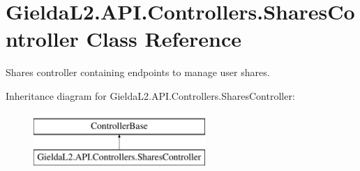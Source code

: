 \hypertarget{class_gielda_l2_1_1_a_p_i_1_1_controllers_1_1_shares_controller}{}\section{Gielda\+L2.\+A\+P\+I.\+Controllers.\+Shares\+Controller Class Reference}
\label{class_gielda_l2_1_1_a_p_i_1_1_controllers_1_1_shares_controller}


Shares controller containing endpoints to manage user shares.  


Inheritance diagram for Gielda\+L2.\+A\+P\+I.\+Controllers.\+Shares\+Controller\+:\begin{figure}[H]
\begin{center}
\leavevmode
\includegraphics[height=2.000000cm]{class_gielda_l2_1_1_a_p_i_1_1_controllers_1_1_shares_controller}
\end{center}
\end{figure}
